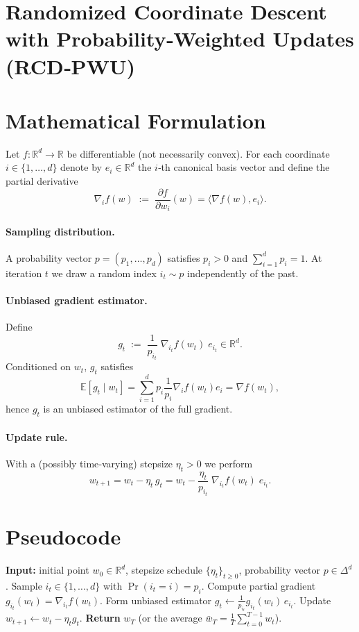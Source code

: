 \documentclass{article}
\newcommand{\EE}{\mathbb{E}}
\newcommand{\RR}{\mathbb{R}}
\begin{document}
\section*{Randomized Coordinate Descent with Probability‑Weighted Updates (RCD‑PWU)}

\section*{Mathematical Formulation}
Let $f:\RR^{d}\rightarrow\RR$ be differentiable (not necessarily convex).  
For each coordinate $i\in\{1,\dots ,d\}$ denote by $e_i\in\RR^{d}$ the $i$‑th canonical basis vector and define the partial derivative 
\[
\nabla_i f(w)\;:=\;\frac{\partial f}{\partial w_i}(w)=\langle\nabla f(w),e_i\rangle .
\]

\paragraph{Sampling distribution.}  
A probability vector $p=(p_1,\dots ,p_d)$ satisfies $p_i>0$ and $\sum_{i=1}^{d}p_i=1$.  
At iteration $t$ we draw a random index $i_t\sim p$ independently of the past.

\paragraph{Unbiased gradient estimator.}  
Define
\[
g_t \;:=\; \frac{1}{p_{i_t}}\;\nabla_{i_t}f(w_t)\;e_{i_t}\in\RR^{d}.
\tag{1}
\]
Conditioned on $w_t$, $g_t$ satisfies
\[
\EE\!\left[g_t\mid w_t\right]
   =\sum_{i=1}^{d}p_i\frac{1}{p_i}\nabla_i f(w_t)e_i
   =\nabla f(w_t),
\tag{2}
\]
hence $g_t$ is an unbiased estimator of the full gradient.

\paragraph{Update rule.}  
With a (possibly time‑varying) stepsize $\eta_t>0$ we perform
\[
w_{t+1}=w_t-\eta_t\,g_t
      =w_t-\frac{\eta_t}{p_{i_t}}\;\nabla_{i_t}f(w_t)\;e_{i_t}.
\tag{3}
\]

\section*{Pseudocode}
\begin{algorithm}[H]
\caption{Randomized Coordinate Descent with Probability‑Weighted Updates}
\begin{algorithmic}[1]
\State \textbf{Input:} initial point $w_0\in\RR^{d}$, stepsize schedule $\{\eta_t\}_{t\ge0}$, probability vector $p\in\Delta^{d}$.
    \State Sample $i_t\in\{1,\dots ,d\}$ with $\Pr(i_t=i)=p_i$.
    \State Compute partial gradient $g_{i_t}(w_t)=\nabla_{i_t}f(w_t)$.
    \State Form unbiased estimator $g_t\gets \frac{1}{p_{i_t}}g_{i_t}(w_t)\,e_{i_t}$.
    \State Update $w_{t+1}\gets w_t-\eta_t g_t$.
\EndFor
\State \textbf{Return} $w_T$ (or the average $\bar w_T=\frac1T\sum_{t=0}^{T-1}w_t$).
\end{algorithmic}
\end{algorithm}
\end{document}

